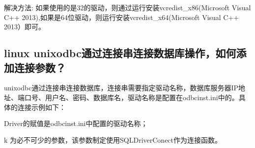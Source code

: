 \documentclass[a4,10pt,oneside,english]{sphinxmanual}
\begin{document}
\begin{figure}[H]
\centering

\noindent{}
\end{figure}

解决方法: 如果使用的是32的驱动，则通过运行安装vcredist\_x86(Microsoft Visual C++ 2013),如果是64位驱动，则运行安装vcredist\_x64(Microsoft Visual C++ 2013）即可。


\subsection{linux unixodbc通过连接串连接数据库操作，如何添加连接参数？}
\label{\detokenize{interface/odbc:linux-unixodbc}}
unixodbc通过连接串连接数据库，连接串需要指定驱动名称，数据库服务器IP地址、端口号、用户名、密码、数据库名，驱动名称是配置在odbcinst.ini中的。具体的连接示例如下：

\begin{sphinxVerbatim}[commandchars=\\\{\}]
  
\end{sphinxVerbatim}

Driver的赋值是odbcinst.ini中配置的驱动名称；

\sphinxhyphen{}k 为必不可少的参数，该参数制定使用SQLDriverConect作为连接函数。
\end{document}
